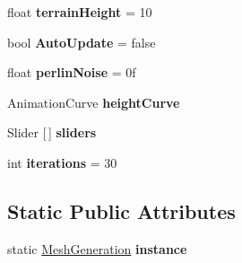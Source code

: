 \begin{DoxyCompactItemize}
float {\bfseries terrain\+Height} = 10
\item 
\mbox{\label{class_assets_1_1_scripts_1_1_mesh_generation_ac6facd09cd95702c8bb30274eca86887}} 
bool {\bfseries Auto\+Update} = false
\item 
\mbox{\label{class_assets_1_1_scripts_1_1_mesh_generation_a1fd8c8a5fa67c20147628540e6d9bbdc}} 
float {\bfseries perlin\+Noise} = 0f
\item 
\mbox{\label{class_assets_1_1_scripts_1_1_mesh_generation_a3d926e041560c3e72d37fc44896abf9e}} 
Animation\+Curve {\bfseries height\+Curve}
\item 
\mbox{\label{class_assets_1_1_scripts_1_1_mesh_generation_ac8644c5bdddab26e448f9bd2fd56935c}} 
Slider \mbox{[}$\,$\mbox{]} {\bfseries sliders}
\item 
\mbox{\label{class_assets_1_1_scripts_1_1_mesh_generation_a68de742ffe15b4aff6f8831b387c8cbb}} 
int {\bfseries iterations} = 30
\end{DoxyCompactItemize}
\subsection*{Static Public Attributes}
\begin{DoxyCompactItemize}
\item 
\mbox{\label{class_assets_1_1_scripts_1_1_mesh_generation_a343439489fdbc13282f26dfea80f9309}} 
static \mbox{\hyperlink{class_assets_1_1_scripts_1_1_mesh_generation}{Mesh\+Generation}} {\bfseries instance}
\end{DoxyCompactItemize}
